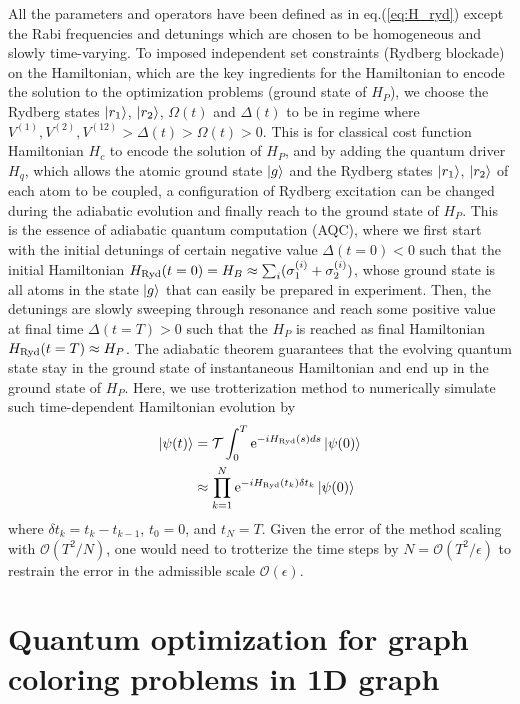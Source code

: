 \documentclass[%
 reprint,
nofootinbib,
 amsmath,amssymb,
 aps,
pra,
floatfix,
]{revtex4-2}
\begin{document}
All the parameters and operators have been defined as in eq.(\ref{eq:H_ryd}) except the Rabi frequencies and detunings which are chosen to be homogeneous and slowly time-varying. To imposed independent set constraints (Rydberg blockade) on the Hamiltonian, which are the key ingredients for the Hamiltonian to encode the solution to the optimization problems (ground state of $H_P$), we choose the Rydberg states $\ket{r_1}$, $\ket{r_2}$, $\Omega(t)$ and $\Delta(t)$ to be in regime where $V^{(1)},V^{(2)},V^{(12)} > \Delta(t) > \Omega(t) > 0$. This is for classical cost function Hamiltonian $H_c$ to encode the solution of $H_P$, and by adding the quantum driver $H_q$, which allows the atomic ground state $\ket{g}$ and the Rydberg states $\ket{r_1}$, $\ket{r_2}$ of each atom to be coupled, a configuration of Rydberg excitation can be changed during the adiabatic evolution and finally reach to the ground state of $H_P$. This is the essence of adiabatic quantum computation (AQC), where we first start with the initial detunings of certain negative value $\Delta(t=0) < 0$ such that the initial Hamiltonian $H_{\rm Ryd}(t=0) = H_B \approx \sum_{i} (\sigma^{(i)}_1 +\sigma^{(i)}_2)$, whose ground state is all atoms in the state $\ket{g}$ that can easily be prepared in experiment. Then, the detunings are slowly sweeping through resonance and reach some positive value at final time $\Delta(t=T)>0$ such that the $H_P$ is reached as final Hamiltonian $H_{\rm Ryd}(t=T) \approx H_P$. The adiabatic theorem guarantees that the evolving quantum state stay in the ground state of instantaneous Hamiltonian and end up in the ground state of $H_P$. Here, we use trotterization method to numerically simulate such time-dependent Hamiltonian evolution by 
\begin{align}
    \ket{\psi(t)} &= \mathcal{T}\int_{0}^{T} {\rm e}^{-i H_{\rm Ryd}(s)ds} \ket{\psi(0)} \nonumber \\
    &\approx \prod_{k=1}^{N}  {\rm e}^{-i H_{\rm Ryd}(t_k)\delta t_k} \ket{\psi(0)}
\end{align}
where $\delta t_k = t_k - t_{k-1}$, $t_0 = 0$, and $t_N=T$. Given the error of the method scaling with $\mathcal{O}(T^2/N)$, one would need to trotterize the time steps by $N = \mathcal{O}(T^2/\epsilon)$ to restrain the error in the admissible scale $\mathcal{O}(\epsilon)$.


\section{Quantum optimization for graph coloring problems in 1D graph}
\end{document}

